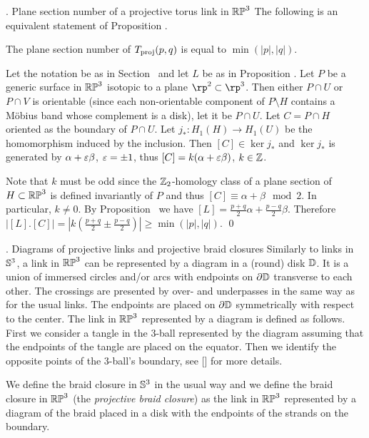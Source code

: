\subhead\sectPS. Plane section number of a projective torus link in $\Bbb{RP}^3$
\endsubhead
%
The following is an equivalent statement of Proposition \propPS.

 The plane section number of $T_{\operatorname{proj}}(p,q)$
is equal to $\min(|p|,|q|)$.
\endproclaim

 Let the notation be as in Section \sectTpqHab\ and let
$L$ be as in Proposition \propTpqHab. Let $P$ be a generic surface in $\Bbb{RP}^3$
isotopic to a plane $\rp^2\subset\rp^3$.
Then either $P\cap U$ or $P\cap V$ is orientable
(since each non-orientable component of $P\setminus H$
contains a M\" obius band whose complement is a disk), let it be $P\cap U$.
Let $C=P\cap H$ oriented as the boundary of $P\cap U$.
Let $j_*:H_1(H)\to H_1(U)$ be the homomorphism induced by the inclusion.
Then $[C]\in\ker j_*$ and $\ker j_*$ is generated by $\alpha+\varepsilon\beta$, $\varepsilon=\pm1$,
thus $[C]=k(\alpha+\varepsilon\beta)$, $k\in\Bbb Z$.

Note that $k$ must be odd since the $\Bbb Z_2$-homology class
of a plane section of $H\subset\Bbb{RP}^3$ is defined invariantly
of $P$ and thus $[C]\equiv \alpha + \beta\mod 2$.
In particular, $k\neq 0$. By Proposition \propHabTpq\ we have
$[L]=\frac{p+q}2\alpha+\frac{p-q}2\beta$.
Therefore $|[L].[C]|=|k(\frac{p+q}2\pm\frac{p-q}2)|\ge\min(|p|,|q|)$.
\qed\enddemo



\subhead\sectDiagr. Diagrams of projective links and projective braid closures
\endsubhead
%
Similarly to links in $\Bbb S^3$, a link in $\Bbb{RP}^3$ can be represented by a diagram in a (round) disk $\Bbb D$.
It is a union of immersed circles and/or arcs with endpoints on $\partial\Bbb D$
transverse to each other. The crossings are presented by over- and underpasses
in the same way as for the usual links. The endpoints are placed on $\partial\Bbb D$
symmetrically with respect to the center. 
The link in $\Bbb{RP}^3$ represented by a diagram is defined as follows.
First we consider a tangle in the 3-ball represented by the diagram assuming that
the endpoints of the tangle are placed on the equator. Then we identify the opposite points
of the 3-ball's boundary, see [] for more details.

We define the braid closure in $\Bbb S^3$ in the usual way and we define the braid closure in $\Bbb{RP}^3$
(the {\it projective braid closure\/}) as the link in $\Bbb{RP}^3$ represented by a diagram of
the braid placed in a disk with the endpoints of the strands on the boundary.

